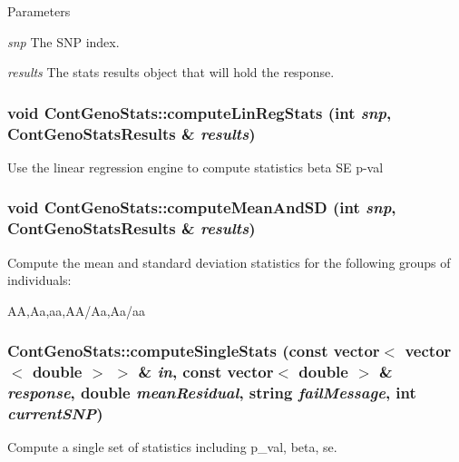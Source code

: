 \begin{DoxyParams}{Parameters}
\item[{\em snp}]The SNP index. \item[{\em results}]The stats results object that will hold the response. \end{DoxyParams}
\hypertarget{classContGenoStats_abf83f07dacc05fa98f45c53bccc8489d}{
\subsubsection[{computeLinRegStats}]{\setlength{\rightskip}{0pt plus 5cm}void ContGenoStats::computeLinRegStats (int {\em snp}, \/  {\bf ContGenoStatsResults} \& {\em results})}}
\label{classContGenoStats_abf83f07dacc05fa98f45c53bccc8489d}
Use the linear regression engine to compute statistics beta SE p-\/val \hypertarget{classContGenoStats_a4e2fbf202fe9a14fa9130ac4486674f5}{
\subsubsection[{computeMeanAndSD}]{\setlength{\rightskip}{0pt plus 5cm}void ContGenoStats::computeMeanAndSD (int {\em snp}, \/  {\bf ContGenoStatsResults} \& {\em results})}}
\label{classContGenoStats_a4e2fbf202fe9a14fa9130ac4486674f5}
Compute the mean and standard deviation statistics for the following groups of individuals:

AA,Aa,aa,AA/Aa,Aa/aa \hypertarget{classContGenoStats_a5bf2b6b904d77644a1e76eadbac9865a}{
\subsubsection[{computeSingleStats}]{ ContGenoStats::computeSingleStats (const vector$<$ vector$<$ double $>$ $>$ \& {\em in}, \/  const vector$<$ double $>$ \& {\em response}, \/  double {\em meanResidual}, \/  string {\em failMessage}, \/  int {\em currentSNP})}}
\label{classContGenoStats_a5bf2b6b904d77644a1e76eadbac9865a}
Compute a single set of statistics including p\_\-val, beta, se.

